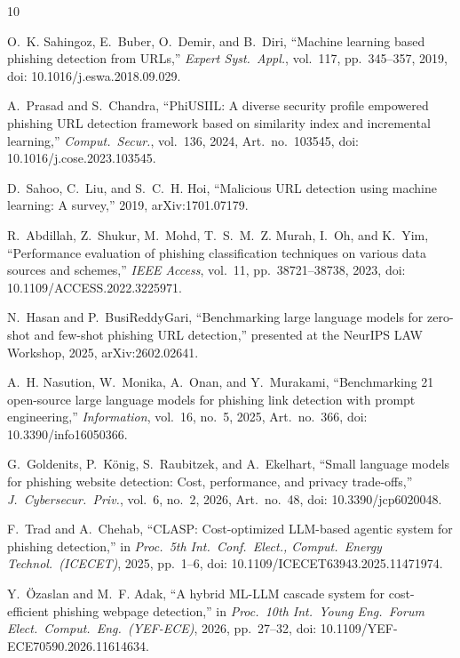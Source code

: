 \documentclass[conference,a4paper]{IEEEtran}
\begin{document}
\begin{thebibliography}{10}

O.~K. Sahingoz, E.~Buber, O.~Demir, and B.~Diri, ``Machine learning based
phishing detection from URLs,'' \emph{Expert Syst.\ Appl.}, vol.~117,
pp.~345--357, 2019, doi: 10.1016/j.eswa.2018.09.029.

A.~Prasad and S.~Chandra, ``PhiUSIIL: A diverse security profile empowered
phishing URL detection framework based on similarity index and incremental
learning,'' \emph{Comput.\ Secur.}, vol.~136, 2024, Art.\ no.~103545,
doi: 10.1016/j.cose.2023.103545.

D.~Sahoo, C.~Liu, and S.~C.~H. Hoi, ``Malicious URL detection using machine
learning: A survey,'' 2019, arXiv:1701.07179.

R.~Abdillah, Z.~Shukur, M.~Mohd, T.~S.~M.~Z. Murah, I.~Oh, and K.~Yim,
``Performance evaluation of phishing classification techniques on various data
sources and schemes,'' \emph{IEEE Access}, vol.~11, pp.~38721--38738, 2023,
doi: 10.1109/ACCESS.2022.3225971.

N.~Hasan and P.~BusiReddyGari, ``Benchmarking large language models for zero-shot
and few-shot phishing URL detection,'' presented at the NeurIPS LAW Workshop, 2025, arXiv:2602.02641.

A.~H. Nasution, W.~Monika, A.~Onan, and Y.~Murakami, ``Benchmarking 21 open-source
large language models for phishing link detection with prompt engineering,''
\emph{Information}, vol.~16, no.~5, 2025, Art.\ no.~366,
doi: 10.3390/info16050366.

G.~Goldenits, P.~K\"{o}nig, S.~Raubitzek, and A.~Ekelhart, ``Small language models
for phishing website detection: Cost, performance, and privacy trade-offs,''
\emph{J.~Cybersecur.\ Priv.}, vol.~6, no.~2, 2026, Art.\ no.~48,
doi: 10.3390/jcp6020048.

F.~Trad and A.~Chehab, ``CLASP: Cost-optimized LLM-based agentic system for phishing
detection,'' in \emph{Proc.\ 5th Int.\ Conf.\ Elect., Comput.\ Energy Technol.\
(ICECET)}, 2025, pp.~1--6, doi: \mbox{10.1109/}\allowbreak\mbox{ICECET63943.2025.11471974}.

Y.~\"{O}zaslan and M.~F. Adak, ``A hybrid ML-LLM cascade system for cost-efficient
phishing webpage detection,'' in \emph{Proc.\ 10th Int.\ Young Eng.\ Forum Elect.\
Comput.\ Eng.\ (YEF-ECE)}, 2026, pp.~27--32,
doi: 10.1109/YEF-ECE70590.2026.11614634.


\end{thebibliography}
\end{document}
